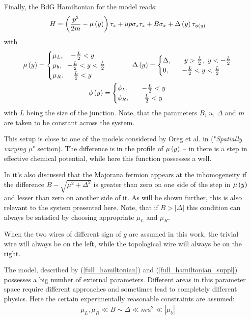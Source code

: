 Finally, the BdG Hamiltonian for the model reads:
\begin{equation}
\label{full_hamiltonian}
H
=
\left(
	\frac{p^2}{2m}
	-\mu\left(y\right)
\right)\tau_z
+
u p \sigma_z \tau_z
+
B\sigma_x	
+
\Delta\left(y\right)\tau_{\phi\left(y\right)}
\end{equation}
with
\begin{gather}
\label{full_hamiltonian_suppl}
	\mu\left(y\right)
	=
	\begin{cases}
		\mu_L,~~~  -\frac{L}{2}<y\\
		\mu_b,~~ -\frac{L}{2} <y <\frac{L}{2}\\
		\mu_R, ~~~~ \frac{L}{2}< y  
	\end{cases}
	~~~~~~~~
	\Delta\left(y\right)
	=
	\begin{cases}
		\Delta,&~~~  y>\frac{L}{2},~y<-\frac{L}{2}\\
		0,
		&~~ -\frac{L}{2} <y <\frac{L}{2}\\
	\end{cases}
		\\
	\phi\left(y\right)
	=
	\begin{cases}
	\phi_L,&~~~  -\frac{L}{2}<y\\
	\phi_R, &~~~~ \frac{L}{2}< y 
	\end{cases}
\end{gather}
with $ L $ being the size of the junction. Note, that the parameters $ B $, $ u $, $ \Delta $ and $ m $ are taken to be constant across the system.
 
  This setup is close to one of the models  considered by Oreg et al. in \cite{Oreg_2010} ("\textit{Spatially varying $ \mu $}" section). The difference is in the profile of $ \mu\left(y\right) $ -- in \cite{Oreg_2010}  there is a step in effective chemical potential, while here this function possesses a well.  
  
 In \cite{Oreg_2010} it's also discussed that the Majorana fermion appears at the inhomogeneity if the difference $ B-\sqrt{\mu^2+\Delta^2} $ is greater than zero on one side of the step in $ \mu\left(y\right) $ and lesser than zero on another side of it. As will be shown further, this is also relevant to the  system presented here. Note, that if $ B > \left|\Delta\right| $ this condition can always be satisfied by choosing appropriate $ \mu_L $ and $ \mu_R $. 
 
 When the two wires of different sign of $ g $ are assumed in this work, the trivial wire will always be on the left, while the topological wire will always be on the right.

 The model, described by (\ref{full_hamiltonian}) and (\ref{full_hamiltonian_suppl}) possesses a big number of external parameters. Different areas in this parameter space require different approaches and sometimes lead to completely different physics. Here the certain experimentally reasonable constraints are assumed:
  \begin{gather}
 \label{constraints}
 	\mu_L,\mu_R \ll B \sim \Delta \ll mu^2\ll \left|\mu_b\right|
 \end{gather} 

